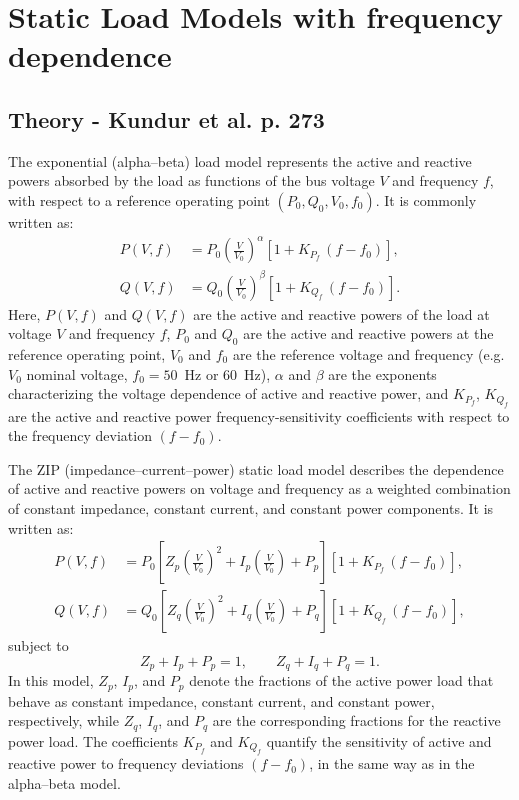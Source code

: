 \documentclass[a4paper, 12pt]{report}
\begin{document}
\chapter*{Static Load Models with frequency dependence}
\section*{Theory - Kundur et al. p. 273}
The exponential (alpha–beta) load model represents the active and reactive powers absorbed by the load as functions of the bus voltage $V$ and frequency $f$, with respect to a reference operating point $(P_0, Q_0, V_0, f_0)$. It is commonly written as:
\begin{align}
P(V,f) &= P_0 \left( \frac{V}{V_0} \right)^{\alpha}
          \left[ 1 + K_{P_f}\,(f - f_0) \right], \\[4pt]
Q(V,f) &= Q_0 \left( \frac{V}{V_0} \right)^{\beta}
          \left[ 1 + K_{Q_f}\,(f - f_0) \right].
\end{align}
Here, $P(V,f)$ and $Q(V,f)$ are the active and reactive powers of the load at voltage $V$ and frequency $f$, $P_0$ and $Q_0$ are the active and reactive powers at the reference operating point, $V_0$ and $f_0$ are the reference voltage and frequency (e.g. $V_0$ nominal voltage, $f_0 = 50$~Hz or $60$~Hz), $\alpha$ and $\beta$ are the exponents characterizing the voltage dependence of active and reactive power, and $K_{P_f}$, $K_{Q_f}$ are the active and reactive power frequency-sensitivity coefficients with respect to the frequency deviation $(f - f_0)$.

The ZIP (impedance–current–power) static load model describes the dependence of active and reactive powers on voltage and frequency as a weighted combination of constant impedance, constant current, and constant power components. It is written as:
\begin{align}
P(V,f) &= P_0 \left[
      Z_{p} \left( \frac{V}{V_0} \right)^2
    + I_{p} \left( \frac{V}{V_0} \right)
    + P_{p}
    \right] \left[ 1 + K_{P_f}\,(f - f_0) \right], \\[4pt]
Q(V,f) &= Q_0 \left[
      Z_{q} \left( \frac{V}{V_0} \right)^2
    + I_{q} \left( \frac{V}{V_0} \right)
    + P_{q}
    \right] \left[ 1 + K_{Q_f}\,(f - f_0) \right],
\end{align}
subject to
\begin{equation}
Z_{p} + I_{p} + P_{p} = 1, \qquad
Z_{q} + I_{q} + P_{q} = 1.
\end{equation}
In this model, $Z_{p}$, $I_{p}$, and $P_{p}$ denote the fractions of the active power load that behave as constant impedance, constant current, and constant power, respectively, while $Z_{q}$, $I_{q}$, and $P_{q}$ are the corresponding fractions for the reactive power load. The coefficients $K_{P_f}$ and $K_{Q_f}$ quantify the sensitivity of active and reactive power to frequency deviations $(f - f_0)$, in the same way as in the alpha–beta model.
\end{document}
